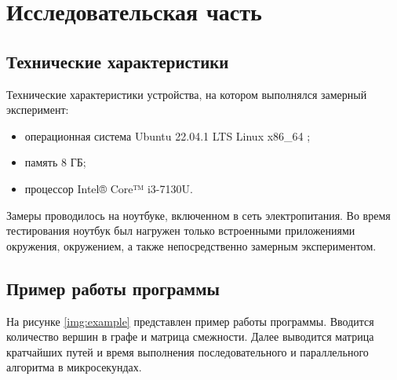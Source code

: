 \chapter{Исследовательская часть}

\section{Технические характеристики}

Технические характеристики устройства, на котором выполнялся замерный эксперимент:
\begin{itemize}
	\item операционная система Ubuntu 22.04.1 LTS Linux x86\_64 \cite{ubuntu};
	\item память 8 ГБ;
	\item процессор Intel® Core™ i3-7130U.
\end{itemize}

Замеры проводилось на ноутбуке, включенном в сеть электропитания. Во время тестирования ноутбук был нагружен только встроенными приложениями окружения, окружением, а также непосредственно замерным экспериментом.

\section{Пример работы программы}

На рисунке \ref{img:example} представлен пример работы программы. Вводится количество вершин в графе и матрица смежности. Далее выводится матрица кратчайших путей и время выполнения последовательного и параллельного алгоритма в микросекундах. 


